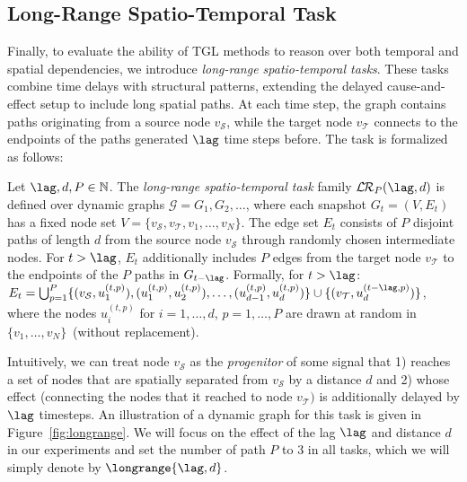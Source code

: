 
\subsection{Long-Range Spatio-Temporal Task} \label{synth-benchmark:long}
Finally, to evaluate the ability of TGL methods to reason over both temporal and spatial dependencies, we introduce  \emph{long-range spatio-temporal tasks}. These tasks combine time delays with structural patterns, extending the delayed cause-and-effect setup to include long spatial paths.  At each time step, the graph contains paths originating from a source node \(v_{\mathcal S}\), while the target node \(v_{\mathcal T}\) connects to the endpoints of the paths generated $\lag$ time steps before.
 The task is formalized as follows:


\begin{definition}
 Let \(\lag, d, P \in \mathbb{N}\). The \emph{long-range spatio-temporal task} family $ \mathcal{L}\hspace{-0.035cm}\mathcal{R}_P(\lag,d)$ is defined over dynamic graphs \(\mathcal{G} = G_1, G_2, \dots\), where each snapshot $G_t = (V, E_t)$ has a fixed node set $V = \{v_{\mathcal S}, v_{\mathcal T}, v_1, \dots, v_{N}\}$. The edge set $E_t$ consists of $P$ disjoint paths of length $d$ from the source node $v_{\mathcal S}$ through randomly chosen intermediate nodes. For $t > \lag$, $E_t$ additionally includes $P$ edges from the target node $v_{\mathcal T}$ to the endpoints of the $P$ paths in $G_{t - \lag}$. Formally, for $t > \lag$:
$
E_t = \bigcup_{p=1}^P \{(v_{\mathcal S}, u_1^{(t,p)}), (u_1^{(t,p)}, u_2^{(t,p)}),\dots, (u_{d-1}^{(t,p)}, u_d^{(t,p)})\} \cup \{(v_{\mathcal T}, u_d^{(t-\lag,p)})\}$, where the nodes $u^{(t,p)}_{i}$ for $i=1,\dots,d$, $p=1,\dots,P$ are drawn at random in $\{v_1,\dots,v_N\}$~(without replacement).
\end{definition}\label{def:long_range}


Intuitively, we can treat node $v_\mathcal{S}$ as the \textit{progenitor} of some signal that 1) reaches a set of nodes that are spatially separated from $v_\mathcal{S}$ by a distance $d$ and 2) whose effect (connecting the nodes that it reached to node $v_\mathcal{T})$ is additionally delayed by $\lag$ timesteps.
An illustration of a dynamic graph for this task is given in Figure~\ref{fig:longrange}.
We will focus on the effect of the lag $\lag$  and distance $d$ in our experiments and set the number of path $P$ to $3$ in all tasks, which we will simply denote by $\longrange{\lag,d}$.

